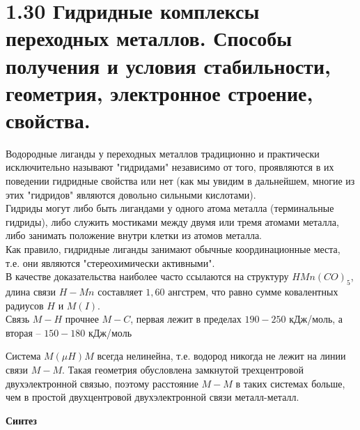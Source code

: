 \section*{1.30 Гидридные комплексы переходных металлов. Способы получения и условия стабильности, геометрия, электронное строение, свойства.}
Водородные лиганды у переходных металлов традиционно и практически исключительно называют "гидридами" независимо от того, проявляются в их поведении гидридные свойства или нет (как мы увидим в дальнейшем, многие из этих "гидридов" являются довольно сильными кислотами). \\
Гидриды могут либо быть лигандами у одного атома металла (терминальные гидриды), либо служить мостиками между двумя или тремя атомами металла, либо занимать положение внутри клетки из атомов металла.  \\
Как правило, гидридные лиганды занимают обычные координационные места, т.е. они являются "стереохимически активными". \\
В качестве доказательства наиболее часто ссылаются на структуру $HMn(CO)_5$, длина связи $H-Mn$ составляет $1,60$ ангстрем, что равно сумме ковалентных радиусов $H$ и $M(I)$. \\
Связь $M-H$ прочнее $M-C$, первая лежит в пределах $190-250$ кДж/моль, а вторая -- $150-180 $ кДж/моль  	
\begin{figure} [H]
	\centering {\texttt{[image: oo2]}}
\end{figure}
Система $M(\mu H)M$ всегда нелинейна, т.е. водород никогда не лежит на линии связи $M - M$. Такая геометрия обусловлена замкнутой трехцентровой двухэлектронной связью, поэтому расстояние $M - M$ в таких системах больше, чем в простой двухцентровой двухэлектронной связи металл-металл.
\begin{figure} [H]
	\centering {\texttt{[image: oo3]}}
\end{figure}
\textbf{Синтез}

